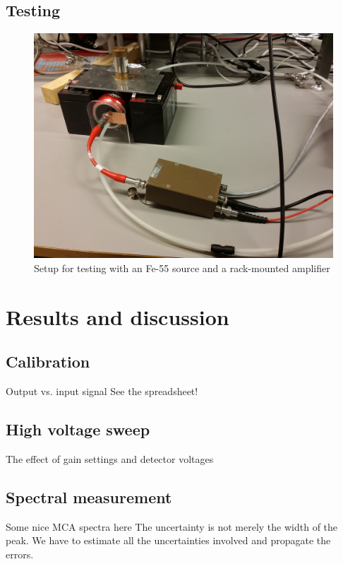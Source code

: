 \documentclass[a4paper]{article}
\begin{document}
\FloatBarrier
\subsection{Testing}

\begin{figure}[ht!]
\centering
\includegraphics[width=\textwidth]{fig/IMG_20201130_144418.jpg}
\caption{Setup for testing with an Fe-55 source and a rack-mounted amplifier}
\end{figure}


\FloatBarrier
\section{Results and discussion}


\subsection{Calibration}
Output vs. input signal
See the spreadsheet!

\subsection{High voltage sweep}
The effect of gain settings and detector voltages

\subsection{Spectral measurement}
Some nice MCA spectra here
The uncertainty is not merely the width of the peak. We have to estimate all the uncertainties involved and propagate the errors.
\end{document}
